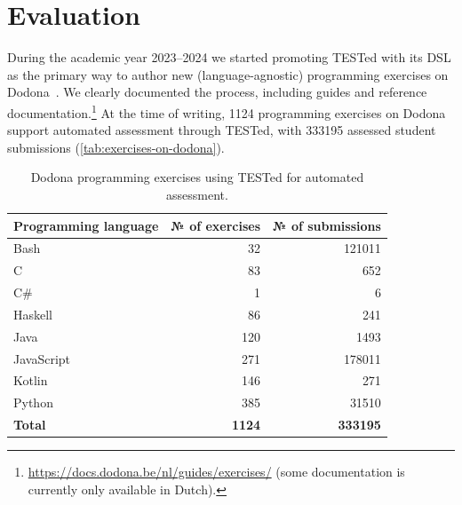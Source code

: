 \documentclass[../main]{subfiles}
\begin{document}
\section{Evaluation}\label{sec:dsl-evaluation}

During the academic year 2023--2024 we started promoting TESTed with its DSL as the primary way to author new (language-agnostic) programming exercises on Dodona~\autocite{vanpetegemDodonaLearnCode2023}.
We clearly documented the process, including guides and reference documentation.\footnote{\url{https://docs.dodona.be/nl/guides/exercises/} (some documentation is currently only available in Dutch).}
At the time of writing, \num{1124} programming exercises on Dodona support automated assessment through TESTed, with \num{333195} assessed student submissions (\vref{tab:exercises-on-dodona}).

\begin{table}
    \centering%
    \caption{Dodona programming exercises using TESTed for automated assessment.\label{tab:exercises-on-dodona}}%
    \small%
    \begin{tabular}{|l|r|r|}
        \hline
        \textbf{Programming language}   & \textbf{№ of exercises}   & \textbf{№ of submissions} \\
        \hline
        Bash                            & \num{32}                  & \num{121011}              \\
        C                               & \num{83}                  & \num{652}                 \\
        C\#                             & \num{1}                   & \num{6}                   \\
        Haskell                         & \num{86}                  & \num{241}                 \\
        Java                            & \num{120}                 & \num{1493}                \\
        JavaScript                      & \num{271}                 & \num{178011}              \\
        Kotlin                          & \num{146}                 & \num{271}                 \\
        Python                          & \num{385}                 & \num{31510}               \\
        \hline
        \textbf{Total}                  & \textbf{\num{1124}}       & \textbf{\num{333195}}     \\
        \hline
    \end{tabular}
\end{table}
\end{document}
